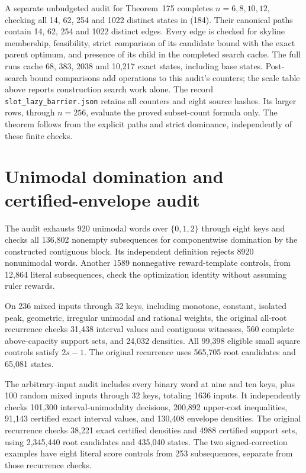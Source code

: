 \documentclass[11pt]{article}
\begin{document}
A separate unbudgeted audit for Theorem~175
completes $n=6,8,10,12$, checking all 14, 62, 254 and 1022 distinct states
in (184). Their canonical paths contain 14, 62,
254 and 1022 distinct edges. Every edge is checked for skyline membership,
feasibility, strict comparison of its candidate bound with the exact
parent optimum, and presence of its child in the completed search cache.
The full runs cache 68, 383, 2038 and 10,217 exact states, including base
states. Post-search bound comparisons add operations to this audit's
counters; the scale table above reports construction search work alone.
The record \texttt{slot\_lazy\_barrier.json} retains all counters and
eight source hashes. Its larger rows, through $n=256$, evaluate the proved
subset-count formula only. The theorem follows from the explicit paths and
strict dominance, independently of these finite checks.

\clearpage
\section{Unimodal domination and certified-envelope audit}
\label{app:unimodal-envelope}
The audit exhausts 920 unimodal words over $\{0,1,2\}$ through eight keys
and checks all 136,802 nonempty subsequences for componentwise domination
by the constructed contiguous block. Its independent definition rejects
8920 nonunimodal words. Another 1589 nonnegative reward-template controls,
from 12,864 literal subsequences, check the optimization identity without
assuming ruler rewards.

On 236 mixed inputs through 32 keys, including monotone, constant, isolated
peak, geometric, irregular unimodal and rational weights, the original
all-root recurrence checks 31,438 interval values and contiguous witnesses,
560 complete above-capacity support sets, and 24,032 densities. All 99,398
eligible small square controls satisfy $2s-1$. The original recurrence
uses 565,705 root candidates and 65,081 states.

The arbitrary-input audit includes every binary word at nine and ten keys,
plus 100 random mixed inputs through 32 keys, totaling 1636 inputs.
It independently checks 101,300 interval-unimodality decisions, 200,892
upper-cost inequalities, 91,143 certified exact interval values, and
130,408 envelope densities. The original recurrence checks 38,221 exact
certified densities and 4988 certified support sets, using 2,345,440 root
candidates and 435,040 states. The two signed-correction examples have eight
literal score controls from 253 subsequences, separate from those recurrence
checks.
\end{document}
